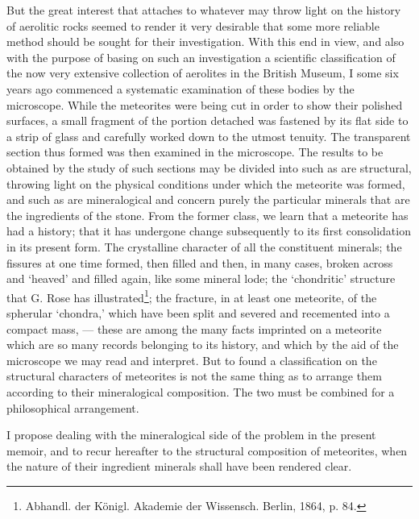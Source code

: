 \documentclass[a4paper, 12pt, oneside]{article}
\begin{document}
But the great interest that attaches to whatever may throw light on the history of aerolitic rocks seemed to render it very desirable that some more reliable method should be sought for their investigation. With this end in view, and also with the purpose of basing on such an investigation a scientific classification of the now very extensive collection of aerolites in the British Museum, I some six years ago commenced a systematic examination of these bodies by the microscope. While the meteorites were being cut in order to show their polished surfaces, a small fragment of the portion detached was fastened by its flat side to a strip of glass and carefully worked down to the utmost tenuity. The transparent section thus formed was then examined in the microscope. The results to be obtained by the study of such sections may be divided into such as are structural, throwing light on the physical conditions under which the meteorite was formed, and such as are mineralogical and concern purely the particular minerals that are the ingredients of the stone. From the former class, we learn that a meteorite has had a history; that it has undergone change subsequently to its first consolidation in its present form. The crystalline character of all the constituent minerals; the fissures at one time formed, then filled and then, in many cases, broken across and `heaved' and filled again, like some mineral lode; the `chondritic' structure that G. Rose has illustrated\footnote{Abhandl. der Königl. Akademie der Wissensch. Berlin, 1864, p. 84.}; the fracture, in at least one meteorite, of the spherular `chondra,' which have been split and severed and recemented into a compact mass, --- these are among the many facts imprinted on a meteorite which are so many records belonging to its history, and which by the aid of the microscope we may read and interpret. But to found a classification on the structural characters of meteorites is not the same thing as to arrange them according to their mineralogical composition. The two must be combined for a philosophical arrangement.

I propose dealing with the mineralogical side of the problem in the present memoir, and to recur hereafter to the structural composition of meteorites, when the nature of their ingredient minerals shall have been rendered clear.
\end{document}
